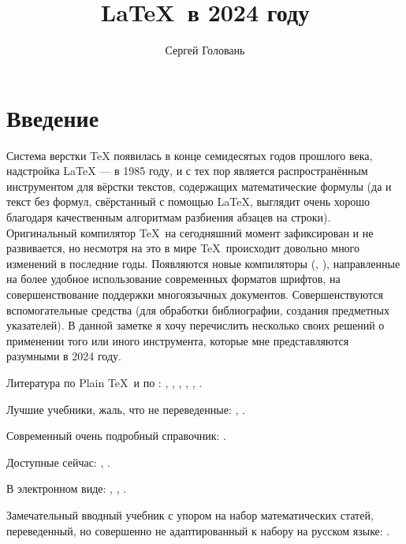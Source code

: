 \documentclass[a4paper,12pt,hyphens]{article}
\title{\LaTeX\ в 2024 году}
\author{Сергей Головань}
\begin{document}
%
\vspace{-\baselineskip}%
\maketitle
{}%
\vspace{-\baselineskip}%
\tableofcontents

\clearpage
\section{Введение}
Система верстки \TeX{} появилась в конце семидесятых годов прошлого века,
надстройка \LaTeX{} --- в 1985 году, и с тех пор является распространённым
инструментом для вёрстки текстов, содержащих математические формулы (да и текст
без формул, свёрстанный с помощью \LaTeX, выглядит очень хорошо благодаря
качественным алгоритмам разбиения абзацев на строки). Оригинальный компилятор
\TeX\ на сегодняшний момент зафиксирован и не развивается, но несмотря на это
в мире \TeX\ происходит довольно много изменений в последние годы. Появляются
новые компиляторы (\XeTeX{}, \LuaTeX{}), направленные
на более удобное использование
современных форматов шрифтов, на совершенствование поддержки многоязычных
документов. Совершенствуются вспомогательные средства (для обработки
библиографии, создания предметных указателей). В данной заметке я хочу
перечислить несколько своих решений о применении того или иного инструмента,
которые мне представляются разумными в 2024 году.

Литература по Plain \TeX\ и по :
\parencite{vinogradov:1992},
\parencite{evgrafov-evgrafov:1993},
\parencite{spivak:1993},
\parencite{knuth:1993},
\parencite{knuth:2003a},
\parencite{knuth:2003b}.

Лучшие учебники, жаль, что не переведенные: 
\parencite{lamport:1994},
\parencite{kopka-daly:2004}.

Современный очень подробный справочник:
\parencite{mittelbach-fischer:2023}.

Доступные сейчас:
\parencite{kottwitz:2022},
\parencite{lvovskiy:2014}.

В электронном виде:
\parencite{vorontsov:2005},
\parencite{stolyarov:2010},
\parencite{kuznetsov:2021}.

Замечательный вводный учебник с упором на набор математических статей, переведенный, но совершенно не адаптированный к набору на русском языке:
\parencite{gratzer:2000}.
\end{document}
